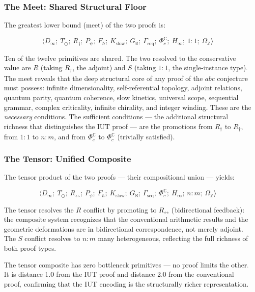 \documentclass[12pt,a4paper]{article}
\begin{document}
\subsubsection{The Meet: Shared Structural Floor}

The greatest lower bound (meet) of the two proofs is:

\[\langle D_{\infty};\ T_{\odot};\ R_{\dagger};\ P_{\psi};\ F_{\hbar};\ K_\text{slow};\ G_{\aleph};\ \Gamma_\text{seq};\ \Phi_c^\mathbb{C};\ H_{\infty};\ 1{:}1;\ \Omega_\mathbb{Z} \rangle\]

Ten of the twelve primitives are shared. The two resolved to the conservative value are $R$ (taking $R_{\dagger}$, the adjoint) and $S$ (taking $1{:}1$, the single-instance type). The meet reveals that the deep structural core of any proof of the $abc$ conjecture must possess: infinite dimensionality, self-referential topology, adjoint relations, quantum parity, quantum coherence, slow kinetics, universal scope, sequential grammar, complex criticality, infinite chirality, and integer winding. These are the \emph{necessary} conditions. The sufficient conditions --- the additional structural richness that distinguishes the IUT proof --- are the promotions from $R_{\dagger}$ to $R_{\dagger}$, from $1{:}1$ to $n{:}m$, and from $\Phi_c^\mathbb{C}$ to $\Phi_c^\mathbb{C}$ (trivially satisfied).

\subsubsection{The Tensor: Unified Composite}

The tensor product of the two proofs --- their compositional union --- yields:

\[\langle D_{\infty};\ T_{\odot};\ R_{\leftrightarrow};\ P_{\psi};\ F_{\hbar};\ K_\text{slow};\ G_{\aleph};\ \Gamma_\text{seq};\ \Phi_c^\mathbb{C};\ H_{\infty};\ n{:}m;\ \Omega_\mathbb{Z} \rangle\]

The tensor resolves the $R$ conflict by promoting to $R_{\leftrightarrow}$ (bidirectional feedback): the composite system recognizes that the conventional arithmetic results and the geometric deformations are in bidirectional correspondence, not merely adjoint. The $S$ conflict resolves to $n{:}m$ many heterogeneous, reflecting the full richness of both proof types.

The tensor composite has zero bottleneck primitives --- no proof limits the other. It is distance 1.0 from the IUT proof and distance 2.0 from the conventional proof, confirming that the IUT encoding is the structurally richer representation.
\end{document}
